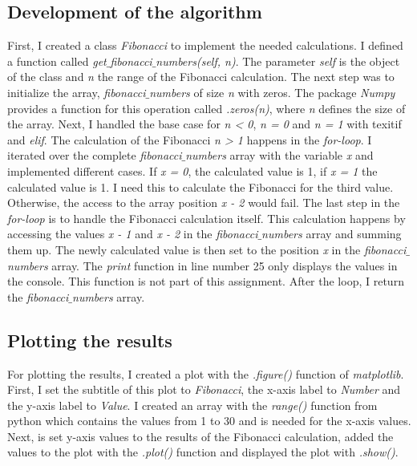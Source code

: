 \documentclass[10pt, a4paper, twocolumn]{article} %
\begin{document}
\subsection{Development of the algorithm}
First, I created a class \textit{Fibonacci} to implement the needed calculations. I defined a function called \textit{get$\_$fibonacci$\_$numbers(self, n)}. The parameter \textit{self} is the object of the class and \textit{n} the range of the Fibonacci calculation. The next step was to initialize the array, \textit{fibonacci$\_$numbers} of size \textit{n} with zeros. The package \textit{Numpy} provides a function for this operation called \textit{.zeros(n)}, where \textit{n} defines the size of the array. Next, I handled the base case for \textit{n < 0}, \textit{n = 0} and \textit{n = 1} with texit{if} and \textit{elif}. The calculation of the Fibonacci \textit{n > 1} happens in the \textit{for-loop}. I iterated over the complete \textit{fibonacci$\_$numbers} array with the variable \textit{x} and implemented different cases. If \textit{x = 0}, the calculated value is 1, if \textit{x = 1} the calculated value is 1. I need this to calculate the Fibonacci for the third value. Otherwise, the access to the array position \textit{x - 2} would fail. The last step in the \textit{for-loop} is to handle the Fibonacci calculation itself. This calculation happens by accessing the values \textit{x - 1} and \textit{x - 2} in the \textit{fibonacci$\_$numbers} array and summing them up. The newly calculated value is then set to the position \textit{x} in the \textit{fibonacci$\_$numbers} array. The \textit{print} function in line number 25 only displays the values in the console. This function is not part of this assignment. After the loop, I return the \textit{fibonacci$\_$numbers} array.  

\subsection{Plotting the results}
For plotting the results, I created a plot with the \textit{.figure()} function of \textit{matplotlib}. First, I set the subtitle of this plot to \textit{Fibonacci}, the x-axis label to \textit{Number} and the y-axis label to \textit{Value}. I created an array with the \textit{range()} function from python which contains the values from 1 to 30 and is needed for the x-axis values. Next, is set y-axis values to the results of the Fibonacci calculation, added the values to the plot with the  \textit{.plot()} function and displayed the plot with \textit{.show()}.
\end{document}
